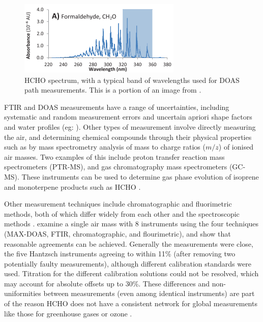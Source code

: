     \begin{figure}
      \includegraphics{Figures/HCHO/HCHOAbsorbanceDavenport.png}
      \caption{ %
        HCHO spectrum, with a typical band of wavelengths used for DOAS path measurements.
        This is a portion of an image from \textcite{Davenport2015}.}
      \label{LR:HCHO:Measurements:fig_HCHOSpectrum}
    \end{figure}
    
    FTIR and DOAS measurements have a range of uncertainties, including systematic and random measurement errors and uncertain apriori shape factors and water profiles (eg: \textcite{Franco2015}).
    Other types of measurement involve directly measuring the air, and determining chemical compounds through their physical properties such as by mass spectrometry analysis of mass to charge ratios ($m/z$) of ionised air masses.
    Two examples of this include proton transfer reaction mass spectrometers (PTR-MS), and gas chromatography mass spectrometers (GC-MS).
    These instruments can be used to determine gas phase evolution of isoprene and monoterpene products such as HCHO \parencite[eg.][]{Lee2006a,Nguyen2014,Wolfe2016,Lerner2017}.
        
    Other measurement techniques include chromatographic and fluorimetric methods, both of which differ widely from each other and the spectroscopic methods \parencite{Hak2005}.
    \textcite{Hak2005} examine a single air mass with 8 instruments using the four techniques (MAX-DOAS, FTIR, chromatographic, and flourimetric), and show that reasonable agreements can be achieved.
    Generally the measurements were close, the five Hantzsch instruments agreeing to within 11\% (after removing two potentially faulty measurements), although different calibration standards were used.
    Titration for the different calibration solutions could not be resolved, which may account for absolute offsets up to 30\%.
    These differences and non-uniformities between measurements (even among identical instruments) are part of the reason HCHO does not have a consistent network for global measurements like those for greenhouse gases or ozone \parencite{FortemsCheiney2012}.
  
